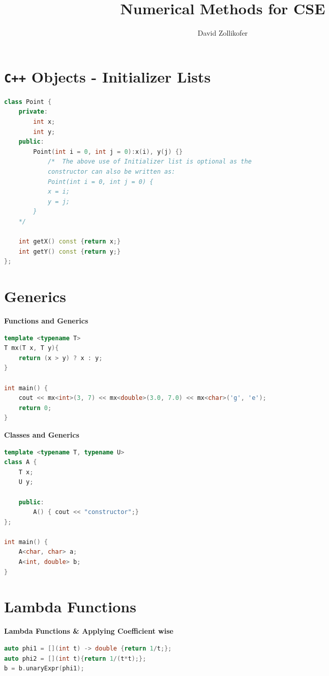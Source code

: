 \documentclass{sciposter}
\title{\huge{Numerical Methods for CSE}}
\author{\large{David Zollikofer}}
\newcommand{\psection}[1]{\par \textbf{\large#1}}
\begin{document}

\maketitle



\begin{multicols}{2}
	
	
\section*{\texttt{C++} Objects - Initializer Lists}



\begin{lstlisting}[language=c++]
class Point { 
	private: 
		int x; 
		int y; 
	public: 
		Point(int i = 0, int j = 0):x(i), y(j) {}  
			/*  The above use of Initializer list is optional as the  
			constructor can also be written as: 
			Point(int i = 0, int j = 0) { 
			x = i; 
			y = j; 
		} 
	*/    
	
	int getX() const {return x;} 
	int getY() const {return y;} 
}; 
\end{lstlisting}

\section*{Generics}

\psection{Functions and Generics}
\begin{lstlisting}[language=c++]
template <typename T> 
T mx(T x, T y){ 
	return (x > y) ? x : y; 
} 

int main() { 
	cout << mx<int>(3, 7) << mx<double>(3.0, 7.0) << mx<char>('g', 'e'); 
	return 0; 
} 

\end{lstlisting}

\psection{Classes and Generics}
\begin{lstlisting}[language=c++]
template <typename T, typename U> 
class A { 
	T x; 
	U y; 
	
	public: 
		A() { cout << "constructor";} 
}; 

int main() { 
	A<char, char> a; 
	A<int, double> b; 
} 

\end{lstlisting}




\section*{Lambda Functions}
\psection{Lambda Functions \& Applying Coefficient wise}
\begin{lstlisting}[language=C++]
auto phi1 = [](int t) -> double {return 1/t;};
auto phi2 = [](int t){return 1/(t*t);};
b = b.unaryExpr(phi1);
\end{lstlisting}



\end{multicols}
\end{document}
